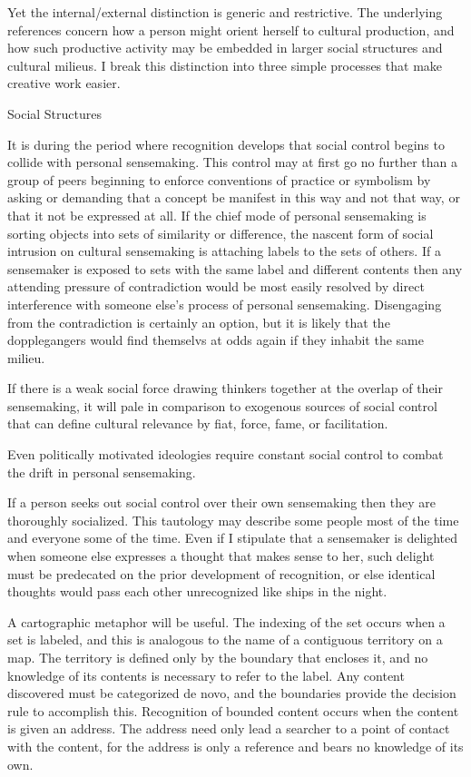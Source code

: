 Yet the internal/external distinction is generic and restrictive. The
underlying references concern how a person might orient herself to
cultural production, and how such productive activity may be embedded in
larger social structures and cultural milieus. I break this distinction
into three simple processes that make creative work easier.

Social Structures
~~~~~~~~~~~~~~~~~

It is during the period where recognition develops that social control
begins to collide with personal sensemaking. This control may at first
go no further than a group of peers beginning to enforce conventions of
practice or symbolism by asking or demanding that a concept be manifest
in this way and not that way, or that it not be expressed at all. If the
chief mode of personal sensemaking is sorting objects into sets of
similarity or difference, the nascent form of social intrusion on
cultural sensemaking is attaching labels to the sets of others. If a
sensemaker is exposed to sets with the same label and different contents
then any attending pressure of contradiction would be most easily
resolved by direct interference with someone else's process of personal
sensemaking. Disengaging from the contradiction is certainly an option,
but it is likely that the dopplegangers would find themselvs at odds
again if they inhabit the same milieu.

If there is a weak social force drawing thinkers together at the overlap
of their sensemaking, it will pale in comparison to exogenous sources of
social control that can define cultural relevance by fiat, force, fame,
or facilitation.

Even politically motivated ideologies require constant social control to
combat the drift in personal sensemaking.

If a person seeks out social control over their own sensemaking then
they are thoroughly socialized. This tautology may describe some people
most of the time and everyone some of the time. Even if I stipulate that
a sensemaker is delighted when someone else expresses a thought that
makes sense to her, such delight must be predecated on the prior
development of recognition, or else identical thoughts would pass each
other unrecognized like ships in the night.

A cartographic metaphor will be useful. The indexing of the set occurs
when a set is labeled, and this is analogous to the name of a contiguous
territory on a map. The territory is defined only by the boundary that
encloses it, and no knowledge of its contents is necessary to refer to
the label. Any content discovered must be categorized de novo, and the
boundaries provide the decision rule to accomplish this. Recognition of
bounded content occurs when the content is given an address. The address
need only lead a searcher to a point of contact with the content, for
the address is only a reference and bears no knowledge of its own.

